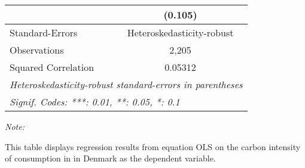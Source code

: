 \begin{table}[htbp!]
\begin{adjustbox}{width = 1\textwidth, max height = 0.95\textheight, center}
\begin{threeparttable}[b]
\begin{tabular}{lc}
                                & (0.105)\\   
            \midrule 
            Standard-Errors     & Heteroskedasticity-robust \\   
            Observations        & 2,205\\  
            Squared Correlation & 0.05312\\  
            \midrule \midrule
            \multicolumn{2}{l}{\emph{Heteroskedasticity-robust standard-errors in parentheses}}\\
            \multicolumn{2}{l}{\emph{Signif. Codes: ***: 0.01, **: 0.05, *: 0.1}}\\
         \end{tabular}
         
         \begin{tablenotes}\item \medskip \textit{Note:}
            \item This table displays regression results from equation OLS on the carbon intensity of consumption in  in Denmark as the dependent variable. 
         \end{tablenotes}
      \end{threeparttable}
   \end{adjustbox}
\end{table}


